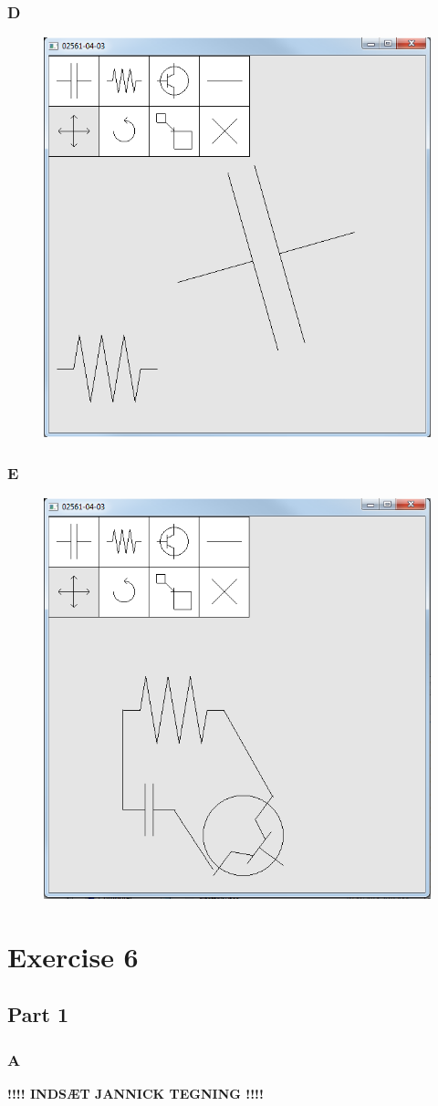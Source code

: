 \documentclass[11pt]{article}
\begin{document}
\subsubsection{D}
\begin{figure}[H]
	\centering
	\includegraphics[width=0.5\linewidth]{images/e05p3d}
	\label{fig:e05p3d}
\end{figure}

\subsubsection{E}
\begin{figure}[H]
	\centering
	\includegraphics[width=0.5\linewidth]{images/e05p3f}
	\label{fig:e05p3f}
\end{figure}



\section{Exercise 6}
\subsection{Part 1}
\subsubsection{A}
\textbf{!!!! INDSÆT JANNICK TEGNING !!!!}
\end{document}
